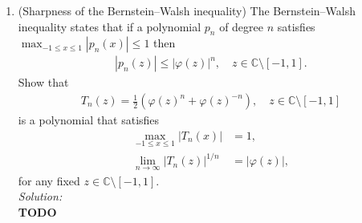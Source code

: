 \documentclass[10pt]{amsart}
\theoremstyle{nonumberplain}
\begin{document}
\begin{enumerate}[label={\bf {\arabic*}:}]
\begin{align*}
   &= \frac{1}{2}\left(\frac{(z + \sqrt{z - 1}\sqrt{z + 1})^2 + 1}{\varphi(z)}\right) \\
   &= \frac{1}{2}\left(\frac{z^2 + 2 z \sqrt{z - 1}\sqrt{z + 1} + (z - 1)(z + 1) + 1}{\varphi(z)}\right) \\
   &= \frac{1}{2}\left(\frac{z^2 + 2 z \sqrt{z - 1}\sqrt{z + 1} + z^2 - 1 + 1}{\varphi(z)}\right) \\
   &= \frac{1}{2}\left(\frac{2z^2 + 2 z \sqrt{z - 1}\sqrt{z + 1}}{\varphi(z)}\right) \\
   &= \frac{2z}{2}\left(\frac{z + \sqrt{z - 1}\sqrt{z + 1}}{\varphi(z)}\right) \\
   &= \frac{2z}{2}\left(\frac{\varphi(z)}{\varphi(z)}\right) \\
   &= z
\end{align*}
\qed
\\

   \item (Sharpness of the Bernstein--Walsh inequality)  The
     Bernstein--Walsh inequality states that if a polynomial $p_n$ of
     degree $n$ satisfies $\max_{-1 \leq x \leq 1} |p_n(x)| \leq 1$
     then
     \begin{align*}
       |p_n(z)| \leq |\varphi(z)|^n, \quad z \in \mathbb C \setminus [-1,1].
     \end{align*}
     Show that
     \begin{align*}
        T_n(z) = \frac 1 2 \left( \varphi(z)^n + \varphi(z)^{-n}
       \right), \quad z \in \mathbb C \setminus [-1,1]
     \end{align*}
     is a polynomial that satisfies
     \begin{align*}
       \max_{-1 \leq x \leq 1} |T_n(x)| &= 1,\\
       \lim_{n \to \infty} |T_n(z)|^{1/n} &= |\varphi(z)|,
     \end{align*}
     for any fixed $z \in \mathbb C \setminus [-1,1]$. \\
\textit{Solution:} \\
\textbf{TODO}
\end{enumerate}
\end{document}
